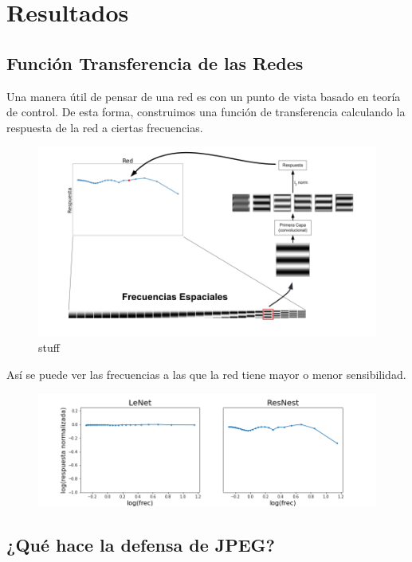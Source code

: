 \section{Resultados}
\subsection{Función Transferencia de las Redes}
Una manera útil de pensar de una red es con un punto de vista basado en teoría de control. De esta forma, construimos una función de transferencia calculando la respuesta de la red a ciertas frecuencias. 
\begin{figure}[h!]
    \centering
    \includegraphics[width=\textwidth]{images/bode_diagrams/explanation_bode.png}
    \caption{stuff}
    \label{bode_explain}
\end{figure}

Así se puede ver las frecuencias a las que la red tiene mayor o menor sensibilidad.

\begin{figure}[h!]
    \centering
    \includegraphics[width=\textwidth]{images/bode_diagrams/mnist_nets.png}
    \caption{}
    \label{bode_examples}
\end{figure}
\subsection{¿Qué hace la defensa de JPEG?}

